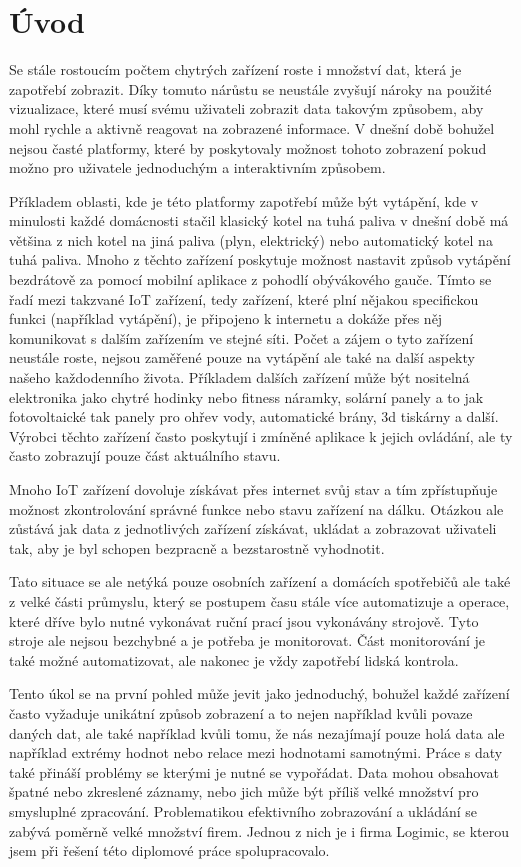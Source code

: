 \chapter{Úvod}
Se stále rostoucím počtem chytrých zařízení roste i množství dat, která je zapotřebí zobrazit. Díky tomuto nárůstu se neustále zvyšují nároky na použité vizualizace, které musí svému uživateli zobrazit data takovým způsobem, aby mohl rychle a aktivně reagovat na zobrazené informace. V dnešní době bohužel nejsou časté platformy, které by poskytovaly možnost tohoto zobrazení pokud možno pro uživatele jednoduchým a interaktivním způsobem.

Příkladem oblasti, kde je této platformy zapotřebí může být vytápění, kde v minulosti každé domácnosti stačil klasický kotel na tuhá paliva v dnešní době má většina z nich kotel na jiná paliva (plyn, elektrický) nebo automatický kotel na tuhá paliva. Mnoho z těchto zařízení poskytuje možnost nastavit způsob vytápění bezdrátově za pomocí mobilní aplikace z pohodlí obývákového gauče. Tímto se řadí mezi takzvané IoT zařízení, tedy zařízení, které plní nějakou specifickou funkci (například vytápění), je připojeno k internetu a dokáže přes něj komunikovat s dalším zařízením ve stejné síti. Počet a zájem o tyto zařízení neustále roste, nejsou zaměřené pouze na vytápění ale také na další aspekty našeho každodenního života. Příkladem dalších zařízení může být nositelná elektronika jako chytré hodinky nebo fitness náramky, solární panely a to jak fotovoltaické tak panely pro ohřev vody, automatické brány, 3d tiskárny a další. Výrobci těchto zařízení často poskytují i zmíněné aplikace k jejich ovládání, ale ty často zobrazují pouze část aktuálního stavu.

Mnoho IoT zařízení dovoluje získávat přes internet svůj stav a tím zpřístupňuje možnost zkontrolování správné funkce nebo stavu zařízení na dálku. Otázkou ale zůstává jak data z jednotlivých zařízení získávat, ukládat a zobrazovat uživateli tak, aby je byl schopen bezpracně a bezstarostně vyhodnotit.

Tato situace se ale netýká pouze osobních zařízení a domácích spotřebičů ale také z velké části průmyslu, který se postupem času stále více automatizuje a operace, které dříve bylo nutné vykonávat ruční prací jsou vykonávány strojově. Tyto stroje ale nejsou bezchybné a je potřeba je monitorovat. Část monitorování je také možné automatizovat, ale nakonec je vždy zapotřebí lidská kontrola. 

Tento úkol se na první pohled může jevit jako jednoduchý, bohužel každé zařízení často vyžaduje unikátní způsob zobrazení a to nejen například kvůli povaze daných dat, ale také například kvůli tomu, že nás nezajímají pouze holá data ale například extrémy hodnot nebo relace mezi hodnotami samotnými. Práce s daty také přináší problémy se kterými je nutné se vypořádat. Data mohou obsahovat špatné nebo zkreslené záznamy, nebo jich může být příliš velké množství pro smysluplné zpracování. Problematikou efektivního zobrazování a ukládání se zabývá poměrně velké množství firem. Jednou z nich je i firma Logimic, se kterou jsem při řešení této diplomové práce spolupracovalo.

